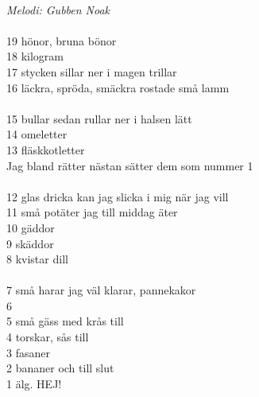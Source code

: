 \\
{\footnotesize\textit{Melodi: Gubben Noak}}\\
\\
19 hönor, bruna bönor\\
18 kilogram\\
17 stycken sillar ner i magen trillar\\
16 läckra, spröda, smäckra rostade små lamm\\
\\
15 bullar sedan rullar ner i halsen lätt\\
14 omeletter\\
13 fläskkotletter\\
Jag bland rätter nästan sätter dem som nummer 1\\
\\
12 glas dricka kan jag slicka i mig när jag vill\\
11 små potäter jag till middag äter\\
10 gäddor\\
9 skäddor\\
8 kvistar dill\\
\\
7 små harar jag väl klarar, pannekakor\\
6\\
5 små gäss med krås till\\
4 torskar, sås till\\
3 fasaner\\
2 bananer och till slut\\
1 älg. HEJ!
